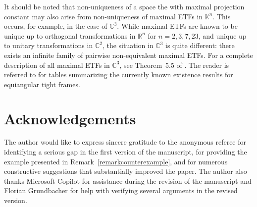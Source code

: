 \documentclass[12pt, reqno]{amsart}
\theoremstyle{definition}
\theoremstyle{remark}
\numberwithin{equation}{section}
\begin{document}
It should be noted that non-uniqueness of a space the with maximal projection constant may also arise from non-uniqueness of maximal ETFs in $\mathbb K^n$. This occurs, for example, in the case of $\mathbb C^3$. While maximal ETFs are known to be unique up to orthogonal transformations in $\mathbb R^n$ for $n=2,3,7,23$, and unique up to unitary transformations in $\mathbb C^2$, the situation in $\mathbb C^3$ is quite different: there exists an infinite family of pairwise non-equivalent maximal ETFs. For a complete description of all maximal ETFs in $\mathbb C^3$, see Theorem~5.5 of \cite{hughstonsalamon}. The reader is referred to \cite{fickusmixon} for tables summarizing the currently known existence results for equiangular tight frames.

\section*{Acknowledgements} 
The author would like to express sincere gratitude to the anonymous referee for identifying a serious gap in the first version of the manuscript, for providing the example presented in Remark~\ref{remarkcounterexample}, and for numerous constructive suggestions that substantially improved the paper. The author also thanks Microsoft Copilot for assistance during the revision of the manuscript and Florian Grundbacher for help with verifying several arguments in the revised version.
\end{document}
